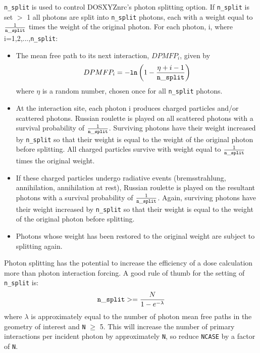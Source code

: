 \documentclass[12pt,twoside]{article}      %
\begin{document}
{\tt n\_split} is used to control DOSXYZnrc's photon splitting option.
If {\tt n\_split} is set $>$ 1 all photons are split
into {\tt n\_split} photons, each with a weight equal to
$\frac{1}{{\tt n\_split}}$ times the weight of the original photon.  For each
photon, i, where i=1,2,...,{\tt n\_split}:
\begin{itemize}
\item The mean free path to its next interaction, $DPMFP_i$, given by
\begin{equation}
DPMFP_i=-{\tt ln}\left(1-\frac{\eta+i-1}{{\tt n\_split}}\right)
\end{equation}
where $\eta$ is a random number, chosen once for all {\tt n\_split} photons.
\item At the interaction site, each photon i produces charged particles and/or
scattered
photons.  Russian roulette is played on all scattered photons with a
survival probability of $\frac{1}{{\tt n\_split}}$.  Surviving photons
have their weight increased by {\tt n\_split} so that their weight is equal
to the weight of the
original photon before splitting.  All charged particles survive with weight equal
to $\frac{1}{{\tt n\_split}}$ times the original weight.
\item If these charged particles undergo radiative events (bremsstrahlung,
  annihilation, annihilation at rest), Russian roulette is played on the
  resultant photons with a survival probability of $\frac{1}{{\tt n\_split}}$.  Again,
  surviving photons have their weight increased by {\tt n\_split} so that their
  weight is equal to the weight of the original photon before splitting.
\item Photons whose weight has been restored to the original weight are
  subject to splitting again.
\end{itemize}

Photon splitting has the potential to increase the efficiency of a dose
calculation more than photon interaction forcing.  A good rule of thumb for
the setting of {\tt n\_split} is:
\begin{equation}
{\tt n\_split}>=\frac{N}{1-e^{-\lambda}}
\end{equation}
where $\lambda$ is approximately equal to the number of photon mean free paths
in the geometry of interest and {\tt N} $\geq$ 5.  This will increase the
number of primary interactions per incident photon by approximately {\tt N},
so reduce {\tt NCASE} by a factor of {\tt N}.
\end{document}
